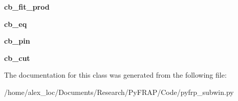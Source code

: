 \begin{DoxyCompactItemize}
\item 
\hypertarget{classpyfrp__subwin_1_1mult__fit__dialog_a49af28a0d8538d3a128bddaae24df611}{{\bfseries cb\+\_\+fit\+\_\+prod}}\label{classpyfrp__subwin_1_1mult__fit__dialog_a49af28a0d8538d3a128bddaae24df611}

\item 
\hypertarget{classpyfrp__subwin_1_1mult__fit__dialog_ab82669683058de548f19a958a60d2d62}{{\bfseries cb\+\_\+eq}}\label{classpyfrp__subwin_1_1mult__fit__dialog_ab82669683058de548f19a958a60d2d62}

\item 
\hypertarget{classpyfrp__subwin_1_1mult__fit__dialog_a4b9a74fbe7990ba9b8870a8f94a82d3d}{{\bfseries cb\+\_\+pin}}\label{classpyfrp__subwin_1_1mult__fit__dialog_a4b9a74fbe7990ba9b8870a8f94a82d3d}

\item 
\hypertarget{classpyfrp__subwin_1_1mult__fit__dialog_a4dda96634c255ea9149c2a98ec7778d4}{{\bfseries cb\+\_\+cut}}\label{classpyfrp__subwin_1_1mult__fit__dialog_a4dda96634c255ea9149c2a98ec7778d4}

\end{DoxyCompactItemize}


The documentation for this class was generated from the following file\+:\begin{DoxyCompactItemize}
\item 
/home/alex\+\_\+loc/\+Documents/\+Research/\+Py\+F\+R\+A\+P/\+Code/pyfrp\+\_\+subwin.\+py\end{DoxyCompactItemize}
